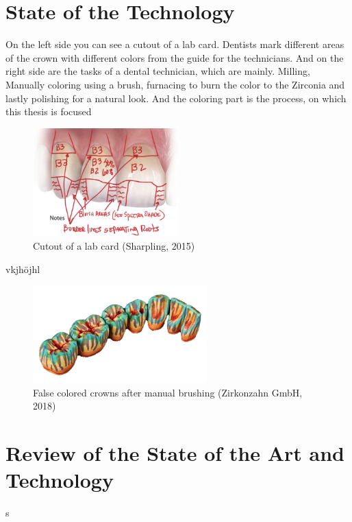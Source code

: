 \chapter{State of the Technology}
\label{sec:stand_technik}
On the left side you can see a cutout of a lab card. Dentists mark different areas of the crown with different colors from the guide for the technicians.
And on the right side are the tasks of a dental technician, which are mainly. Milling, Manually coloring using a brush, furnacing to burn the color to the Zirconia and lastly polishing for a natural look.
And the coloring part is the process, on which this thesis is focused 
\begin{figure}[h]
	\centering
	\includegraphics[width=0.5\textwidth]{grafiken/lab_card.png}
	\caption{Cutout of a lab card (Sharpling, 2015)}
	\label{fig:bild2}
\end{figure}

vkjhöjhl

\begin{figure}[h]
	\centering
	\includegraphics[width=0.6\textwidth]{grafiken/false_colored.png}
	\caption{False colored crowns after manual brushing (Zirkonzahn GmbH, 2018)}
	\label{fig:bild3}
\end{figure}


\chapter{Review of the State of the Art and Technology}
\label{sec:kritik_stand_technik}
s